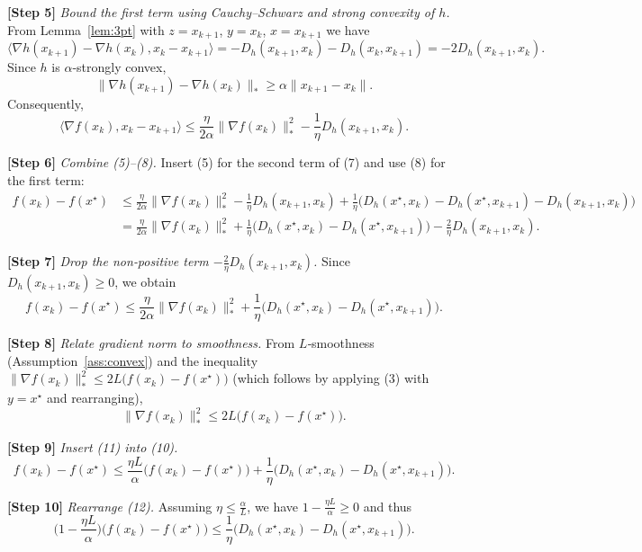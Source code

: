 \documentclass{article}
\newcommand{\inner}[2]{\langle #1,#2\rangle}
\newcommand{\grad}{\nabla}
\newcommand{\D}[2]{D_{h}(#1,#2)}
\begin{document}
\noindent\textbf{[Step 5]} \emph{Bound the first term using Cauchy–Schwarz and strong convexity of $h$.}
From Lemma~\ref{lem:3pt} with $z=x_{k+1}$, $y=x_{k}$, $x=x_{k+1}$ we have
\[
\inner{\grad h(x_{k+1})-\grad h(x_{k})}{x_{k}-x_{k+1}}
= -\D{x_{k+1}}{x_{k}}-\D{x_{k}}{x_{k+1}} = -2\D{x_{k+1}}{x_{k}} .
\]
Since $h$ is $\alpha$‑strongly convex,
\[
\| \grad h(x_{k+1})-\grad h(x_{k})\|_{*}\ge \alpha\|x_{k+1}-x_{k}\|.
\]
Consequently,
\[
\inner{\grad f(x_{k})}{x_{k}-x_{k+1}}
\le \frac{\eta}{2\alpha}\|\grad f(x_{k})\|_{*}^{2}
     -\frac{1}{\eta}\D{x_{k+1}}{x_{k}}.
\tag{8}
\]

\noindent\textbf{[Step 6]} \emph{Combine (5)–(8).}
Insert (5) for the second term of (7) and use (8) for the first term:
\[
\begin{aligned}
f(x_{k})-f(x^{\star})
&\le \frac{\eta}{2\alpha}\|\grad f(x_{k})\|_{*}^{2}
      -\frac{1}{\eta}\D{x_{k+1}}{x_{k}}
      +\frac{1}{\eta}\bigl(\D{x^{\star}}{x_{k}}-\D{x^{\star}}{x_{k+1}}-\D{x_{k+1}}{x_{k}}\bigr)\\[4pt]
&= \frac{\eta}{2\alpha}\|\grad f(x_{k})\|_{*}^{2}
   +\frac{1}{\eta}\bigl(\D{x^{\star}}{x_{k}}-\D{x^{\star}}{x_{k+1}}\bigr)
   -\frac{2}{\eta}\D{x_{k+1}}{x_{k}} .
\end{aligned}
\tag{9}
\]

\noindent\textbf{[Step 7]} \emph{Drop the non‑positive term $-\frac{2}{\eta}\D{x_{k+1}}{x_{k}}$.}
Since $\D{x_{k+1}}{x_{k}}\ge0$, we obtain
\[
f(x_{k})-f(x^{\star})
\le \frac{\eta}{2\alpha}\|\grad f(x_{k})\|_{*}^{2}
   +\frac{1}{\eta}\bigl(\D{x^{\star}}{x_{k}}-\D{x^{\star}}{x_{k+1}}\bigr).
\tag{10}
\]

\noindent\textbf{[Step 8]} \emph{Relate gradient norm to smoothness.}
From $L$‑smoothness (Assumption~\ref{ass:convex}) and the inequality
$\|\grad f(x_{k})\|_{*}^{2}\le 2L\bigl(f(x_{k})-f(x^{\star})\bigr)$
(which follows by applying (3) with $y=x^{\star}$ and rearranging),
\[
\|\grad f(x_{k})\|_{*}^{2}\le 2L\bigl(f(x_{k})-f(x^{\star})\bigr).
\tag{11}
\]

\noindent\textbf{[Step 9]} \emph{Insert (11) into (10).}
\[
f(x_{k})-f(x^{\star})
\le \frac{\eta L}{\alpha}\bigl(f(x_{k})-f(x^{\star})\bigr)
   +\frac{1}{\eta}\bigl(\D{x^{\star}}{x_{k}}-\D{x^{\star}}{x_{k+1}}\bigr).
\tag{12}
\]

\noindent\textbf{[Step 10]} \emph{Rearrange (12).}
Assuming $\eta\le \frac{\alpha}{L}$, we have $1-\frac{\eta L}{\alpha}\ge0$ and thus
\[
\bigl(1-\frac{\eta L}{\alpha}\bigr)\bigl(f(x_{k})-f(x^{\star})\bigr)
\le \frac{1}{\eta}\bigl(\D{x^{\star}}{x_{k}}-\D{x^{\star}}{x_{k+1}}\bigr).
\tag{13}
\]
\end{document}
